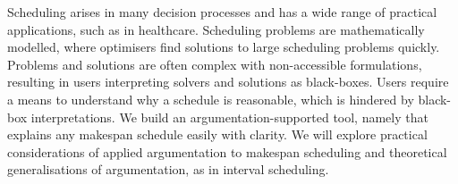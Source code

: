 Scheduling arises in many decision processes and has a wide range of practical applications, such as in healthcare. Scheduling problems are mathematically modelled, where optimisers find solutions to large scheduling problems quickly. Problems and solutions are often complex with non-accessible formulations, resulting in users interpreting solvers and solutions as black-boxes. Users require a means to understand why a schedule is reasonable, which is hindered by black-box interpretations.
\linespace
We build an argumentation-supported tool, namely \emph{\toolname} that explains any makespan schedule easily with clarity. We will explore practical considerations of applied argumentation to makespan scheduling and theoretical generalisations of argumentation, as in interval scheduling.